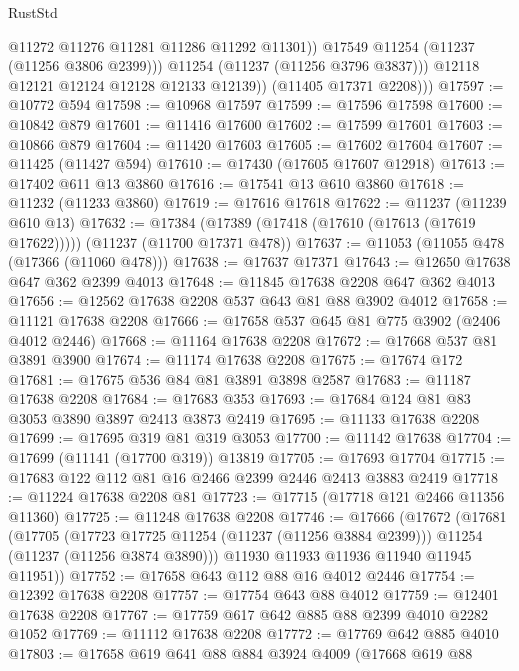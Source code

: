 \begin{lexlean}{RustStd}
\begin{coremodule}
                    @11272
                    @11276
                    @11281
                    @11286
                    @11292
                    @11301))
                @17549
                @11254
                (@11237 (@11256 @3806 @2399)))
              @11254
              (@11237 (@11256 @3796 @3837)))
            @12118
            @12121
            @12124
            @12128
            @12133
            @12139))
        (@11405 @17371 @2208)))
@17597 := @10772 @594
@17598 := @10968 @17597
@17599 := @17596 @17598
@17600 := @10842 @879
@17601 := @11416 @17600
@17602 := @17599 @17601
@17603 := @10866 @879
@17604 := @11420 @17603
@17605 := @17602 @17604
@17607 := @11425 (@11427 @594)
@17610 := @17430 (@17605 @17607 @12918)
@17613 := @17402 @611 @13 @3860
@17616 := @17541 @13 @610 @3860
@17618 := @11232 (@11233 @3860)
@17619 := @17616 @17618
@17622 := @11237 (@11239 @610 @13)
@17632 := @17384 (@17389 (@17418 (@17610 (@17613 (@17619 @17622))))) (@11237 (@11700 @17371 @478))
@17637 := @11053 (@11055 @478 (@17366 (@11060 @478)))
@17638 := @17637 @17371
@17643 := @12650 @17638 @647 @362 @2399 @4013
@17648 := @11845 @17638 @2208 @647 @362 @4013
@17656 := @12562 @17638 @2208 @537 @643 @81 @88 @3902 @4012
@17658 := @11121 @17638 @2208
@17666 := @17658 @537 @645 @81 @775 @3902 (@2406 @4012 @2446)
@17668 := @11164 @17638 @2208
@17672 := @17668 @537 @81 @3891 @3900
@17674 := @11174 @17638 @2208
@17675 := @17674 @172
@17681 := @17675 @536 @84 @81 @3891 @3898 @2587
@17683 := @11187 @17638 @2208
@17684 := @17683 @353
@17693 := @17684 @124 @81 @83 @3053 @3890 @3897 @2413 @3873 @2419
@17695 := @11133 @17638 @2208
@17699 := @17695 @319 @81 @319 @3053
@17700 := @11142 @17638
@17704 := @17699 (@11141 (@17700 @319)) @13819
@17705 := @17693 @17704
@17715 := @17683 @122 @112 @81 @16 @2466 @2399 @2446 @2413 @3883 @2419
@17718 := @11224 @17638 @2208 @81
@17723 := @17715 (@17718 @121 @2466 @11356 @11360)
@17725 := @11248 @17638 @2208
@17746 := @17666
    (@17672
      (@17681
        (@17705
          (@17723 @17725 @11254 (@11237 (@11256 @3884 @2399)))
          @11254
          (@11237 (@11256 @3874 @3890)))
        @11930
        @11933
        @11936
        @11940
        @11945
        @11951))
@17752 := @17658 @643 @112 @88 @16 @4012 @2446
@17754 := @12392 @17638 @2208
@17757 := @17754 @643 @88 @4012
@17759 := @12401 @17638 @2208
@17767 := @17759 @617 @642 @885 @88 @2399 @4010 @2282 @1052
@17769 := @11112 @17638 @2208
@17772 := @17769 @642 @885 @4010
@17803 := @17658
    @619
    @641
    @88
    @884
    @3924
    @4009
    (@17668
      @619
      @88

\end{coremodule}
\end{lexlean}

